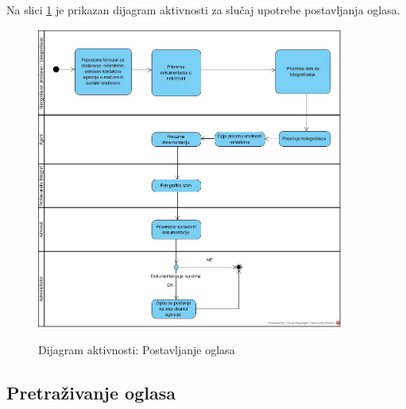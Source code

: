 \documentclass[20pt]{article}
\begin{document}
\newpage
{}
\setlength{\parindent}{1cm}
\fontsize{13}{18} \selectfont 
Na slici \ref{fig:dijagramAktivnostiPostavljanjeOglasa} je prikazan dijagram aktivnosti za slu\v{c}aj upotrebe postavljanja oglasa.

\begin{figure}[h]
		\centering
		\includegraphics[width=0.9\textwidth,height=0.74\textheight]{Pictures/DijagramAktivnosti-PostavljanjeOglasa}\\
		\caption{Dijagram aktivnosti: Postavljanje oglasa}
		\label{fig:dijagramAktivnostiPostavljanjeOglasa}
	\end{figure}

\newpage
\subsection{\bfseries \Large Pretra\v {z}ivanje oglasa}
\setlength{\parindent}{1cm}
\fontsize{13}{18} \selectfont 
\end{document}
